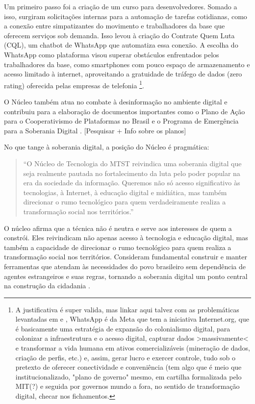 Um primeiro passo foi a criação de um curso para desenvolvedores. Somado a isso, surgiram solicitações internas para a automação de tarefas cotidianas, como a conexão entre simpatizantes do movimento e trabalhadores da base que oferecem serviços sob demanda. Isso levou à criação do Contrate Quem Luta (CQL), um chatbot de WhatsApp que automatiza essa conexão. A escolha do WhatsApp como plataforma visou superar obstáculos enfrentados pelos trabalhadores da base, como smartphones com pouco espaço de armazenamento e acesso limitado à internet, aproveitando a gratuidade de tráfego de dados (zero rating) oferecida pelas empresas de telefonia \footnote{A justificativa é super valida, mas linkar aqui talvez com as problemáticas levantadas em \cite{Silveira2021} e \cite{Faustino2023}, WhatsApp é da Meta que tem a iniciativa Internet.org, que é basicamente uma estratégia de expansão do colonialismo digital, para colonizar a infraestrutura e o acesso digital, capturar dados >massivamente< e transformar a vida humana em ativos comercializáveis (mineração de dados, criação de perfis, etc.) e, assim, gerar lucro e exercer controle, tudo sob o pretexto de oferecer conectividade e conveniência (tem algo que é meio que institucionalizado, "plano de governo" mesmo, em cartilha formalizada pelo MIT(?) e seguida por governos mundo a fora, no sentido de transformação digital, checar nos fichamentos.}.

O Núcleo também atua no combate à desinformação no ambiente digital e contribuiu para a elaboração de documentos importantes como o Plano de Ação para o Cooperativismo de Plataformas no Brasil e o Programa de Emergência para a Soberania Digital \cite{mtst2023cartilha}. [Pesquisar + Info sobre os planos]

No que tange à soberania digital, a posição do Núcleo é pragmática:
\begin{quote}
“O Núcleo de Tecnologia do MTST reivindica uma soberania digital que seja realmente pautada no fortalecimento da luta pelo poder popular na era da sociedade da informação. Queremos não só acesso significativo às tecnologias, à Internet, à educação digital e midiática, mas também direcionar o rumo tecnológico para quem verdadeiramente realiza a transformação social nos territórios.” \cite[p.~5]{mtst2023cartilha}
\end{quote}
O núcleo afirma que a técnica não é neutra e serve aos interesses de quem a constrói.
Eles reivindicam não apenas acesso à tecnologia e educação digital, mas também a capacidade de direcionar o rumo tecnológico para quem realiza a transformação social nos territórios. Consideram fundamental construir e manter ferramentas que atendam às necessidades do povo brasileiro sem dependência de agentes estrangeiros e suas regras, tornando a soberania digital um ponto central na construção da cidadania \cite{mtst2023cartilha}.


